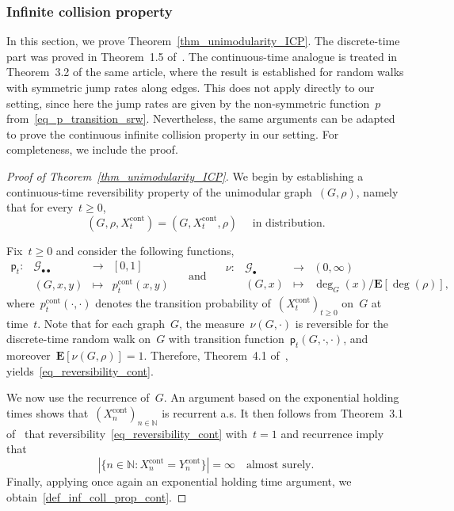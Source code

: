 \documentclass[a4paper,11pt]{article}
\newcommand{\NN}{\mathbb{N}}
\theoremstyle{definition}
\begin{document}
\subsubsection{Infinite collision property}
In this section, we prove Theorem~\ref{thm_unimodularity_ICP}. The discrete-time part was proved in Theorem~1.5 of~\cite{HutchcroftPeres2015}. The continuous-time analogue is treated in Theorem~3.2 of the same article, where the result is established for random walks with symmetric jump rates along edges. This does not apply directly to our setting, since here the jump rates are given by the non-symmetric function~$p$ from~\eqref{eq_p_transition_srw}. Nevertheless, the same arguments can be adapted to prove the continuous infinite collision property in our setting. For completeness, we include the proof.

\begin{proof}[Proof of Theorem~\ref{thm_unimodularity_ICP}]
We begin by establishing a continuous-time reversibility property of the unimodular graph~$(G,\rho)$, namely that for every~$t \ge 0$,
\begin{equation}\label{eq_reversibility_cont}
(G,\rho,X^\mathrm{cont}_t) = (G,X^\mathrm{cont}_t,\rho) \quad \text{ in distribution.}  
\end{equation}

Fix~$t \ge 0$ and consider the following functions,
$$ \begin{array}{cccc}
    \mathsf p_t:&  \mathcal G_{\bullet \bullet} & \to & [0,1] \\[2mm]
    & (G,x,y) & \mapsto & p^\mathrm{cont}_t(x,y)
\end{array} \quad \text{ and } \quad \begin{array}{cccc}
    \nu: & \mathcal G_{\bullet } & \to & (0,\infty) \\[2mm]
    &(G,x) & \mapsto & \deg_G(x)/\mathbf{E}[\deg(\rho)],
\end{array}$$
where~$p^\mathrm{cont}_t(\cdot,\cdot)$ denotes the transition probability of~$(X^\mathrm{cont}_t)_{t \ge 0}$ on~$G$ at time~$t$. Note that for each graph~$G$, the measure~$\nu(G,\cdot)$ is reversible for the discrete-time random walk on~$G$ with transition function~$\mathsf p_t(G, \cdot , \cdot )$, and moreover~$\mathbf E[ \nu(G,\rho)] = 1$. Therefore, Theorem~4.1 of~\cite{AldousLyons2007}, yields~\eqref{eq_reversibility_cont}.

We now use the recurrence of~$G$. An argument based on the exponential holding times shows that~$(X^\mathrm{cont}_n)_{n \in \NN}$ is recurrent a.s. It then follows from Theorem~3.1 of~\cite{HutchcroftPeres2015} that reversibility~\eqref{eq_reversibility_cont} with~$t = 1$ and recurrence imply that
$$ |\{ n \in \NN: X^\mathrm{cont}_n = Y^\mathrm{cont}_n \}| = \infty \quad \text{almost surely.} $$
Finally, applying once again an exponential holding time argument, we obtain~\eqref{def_inf_coll_prop_cont}.
\end{proof}
\end{document}
